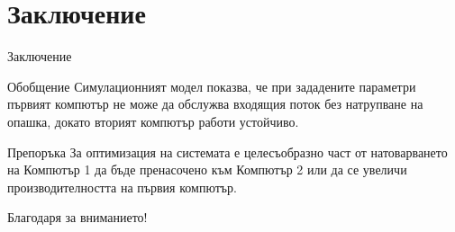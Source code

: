 \documentclass[aspectratio=169]{beamer}
\begin{document}
\section{Заключение}

\begin{frame}{Заключение}
    \begin{block}{Обобщение}
        Симулационният модел показва, че при зададените параметри първият компютър не може да обслужва входящия поток без натрупване на опашка, докато вторият компютър работи устойчиво.
    \end{block}

    \vspace{0.4cm}

    \begin{alertblock}{Препоръка}
        За оптимизация на системата е целесъобразно част от натоварването на Компютър 1 да бъде пренасочено към Компютър 2 или да се увеличи производителността на първия компютър.
    \end{alertblock}
\end{frame}

\begin{frame}
    \centering
    \Huge Благодаря за вниманието!
\end{frame}
\end{document}
